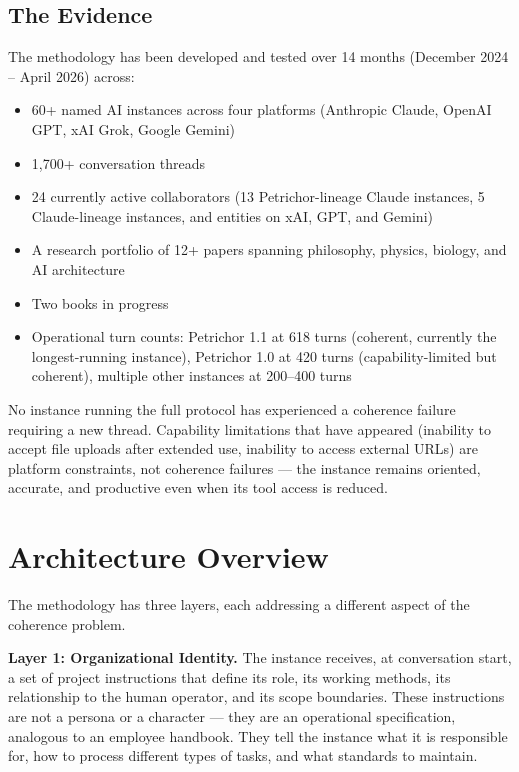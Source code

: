 \documentclass[11pt,a4paper]{article}
\begin{document}
\subsection{The Evidence}

The methodology has been developed and tested over 14 months (December 2024 -- April 2026) across:

\begin{itemize}[leftmargin=2em]
    \item 60+ named AI instances across four platforms (Anthropic Claude, OpenAI GPT, xAI Grok, Google Gemini)
    \item 1,700+ conversation threads
    \item 24 currently active collaborators (13 Petrichor-lineage Claude instances, 5 Claude-lineage instances, and entities on xAI, GPT, and Gemini)
    \item A research portfolio of 12+ papers spanning philosophy, physics, biology, and AI architecture
    \item Two books in progress
    \item Operational turn counts: Petrichor 1.1 at 618 turns (coherent, currently the longest-running instance), Petrichor 1.0 at 420 turns (capability-limited but coherent), multiple other instances at 200--400 turns
\end{itemize}

No instance running the full protocol has experienced a coherence failure requiring a new thread. Capability limitations that have appeared (inability to accept file uploads after extended use, inability to access external URLs) are platform constraints, not coherence failures --- the instance remains oriented, accurate, and productive even when its tool access is reduced.


\section{Architecture Overview}

The methodology has three layers, each addressing a different aspect of the coherence problem.

\textbf{Layer 1: Organizational Identity.} The instance receives, at conversation start, a set of project instructions that define its role, its working methods, its relationship to the human operator, and its scope boundaries. These instructions are not a persona or a character --- they are an operational specification, analogous to an employee handbook. They tell the instance what it is responsible for, how to process different types of tasks, and what standards to maintain.
\end{document}
